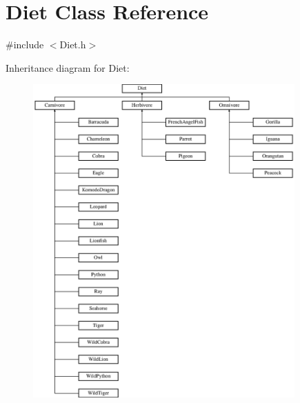 \hypertarget{classDiet}{\section{Diet Class Reference}
\label{classDiet}
}


{\ttfamily \#include $<$Diet.\+h$>$}

Inheritance diagram for Diet\+:\begin{figure}[H]
\begin{center}
\leavevmode
\includegraphics[height=12.000000cm]{classDiet}
\end{center}
\end{figure}
